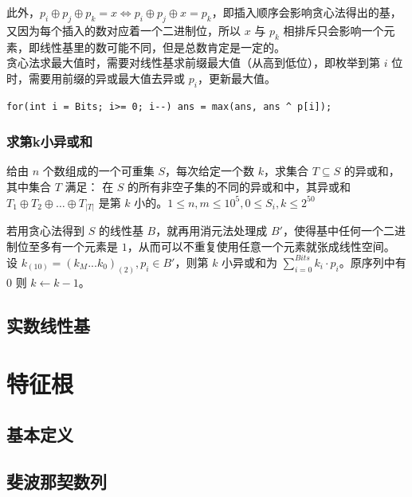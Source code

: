 \documentclass[12pt,a4paper]{article}
\begin{document}
此外，$p_i\oplus p_j\oplus p_k=x\iff p_i\oplus p_j\oplus x=p_k$，即插入顺序会影响贪心法得出的基，又因为每个插入的数对应着一个二进制位，所以 $x$ 与 $p_k$ 相排斥只会影响一个元素，即线性基里的数可能不同，但是总数肯定是一定的。\\
贪心法求最大值时，需要对线性基求前缀最大值（从高到低位），即枚举到第 $i$ 位时，需要用前缀的异或最大值去异或 $p_i$，更新最大值。
\begin{lstlisting}
for(int i = Bits; i>= 0; i--) ans = max(ans, ans ^ p[i]);
\end{lstlisting}

\subsubsection{求第k小异或和}
\begin{mdframed}[leftline=true, linewidth=2pt, linecolor=gray]
	给由 $n$ 个数组成的一个可重集 $S$，每次给定一个数 $k$，求集合 $T \subseteq S$ 的异或和，其中集合 $T$ 满足： 在 $S$ 的所有非空子集的不同的异或和中，其异或和 $T_1 \oplus T_2 \oplus \ldots \oplus T_{|T|}$ 是第 $k$ 小的。$1\le n,m\le 10^5,0\le S_i,k\le2^{50}$
\end{mdframed}
若用贪心法得到 $S$ 的线性基 $B$，就再用消元法处理成 $B'$，使得基中任何一个二进制位至多有一个元素是 $1$，从而可以不重复使用任意一个元素就张成线性空间。\\
设 $k_{(10)}=(k_M...k_0)_{(2)},p_i\in B'$，则第 $k$ 小异或和为 $\displaystyle\sum_{i=0}^{Bits}k_i\cdot p_i$。原序列中有 $0$ 则 $k\leftarrow k-1$。
\subsection{实数线性基}

\newpage
\section{特征根} %
\subsection{基本定义}
\subsection{斐波那契数列}
\end{document}
